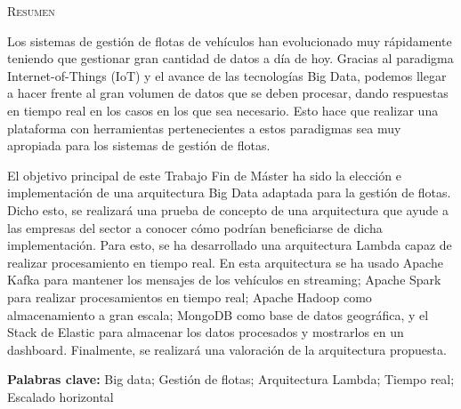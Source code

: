 
\textsc{\noindent\LARGE Resumen}

Los sistemas de gestión de flotas de vehículos han evolucionado muy
rápidamente teniendo que gestionar gran cantidad de datos a día de
hoy. Gracias al paradigma Internet-of-Things (IoT) y el avance de las
tecnologías Big Data, podemos llegar a hacer frente al gran volumen de
datos que se deben procesar, dando respuestas en tiempo real en los
casos en los que sea necesario. Esto hace que realizar una plataforma
con herramientas pertenecientes a estos paradigmas sea muy apropiada
para los sistemas de gestión de flotas.

El objetivo principal de este Trabajo Fin de Máster ha sido la
elección e implementación de una arquitectura Big Data adaptada para
la gestión de flotas. Dicho esto, se realizará una prueba de concepto
de una arquitectura que ayude a las empresas del sector a conocer cómo
podrían beneficiarse de dicha implementación. Para esto, se ha
desarrollado una arquitectura Lambda capaz de realizar procesamiento
en tiempo real. En esta arquitectura se ha usado Apache Kafka para
mantener los mensajes de los vehículos en streaming; Apache Spark
para realizar procesamientos en tiempo real; Apache Hadoop como
almacenamiento a gran escala; MongoDB como base de datos geográfica,
y el Stack de Elastic para almacenar los datos procesados y mostrarlos
en un dashboard. Finalmente, se realizará una valoración de la
arquitectura propuesta.

\hfill \break \textbf{Palabras clave:} Big data; Gestión de flotas;
Arquitectura Lambda; Tiempo real; Escalado horizontal

